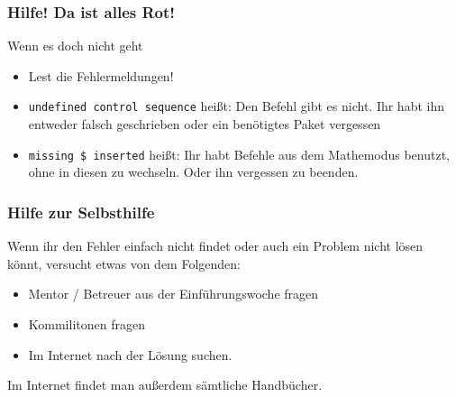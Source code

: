 \begin{frame}
    \frametitle{Hilfe! Da ist alles Rot!}
    \begin{alertblock}{Wenn es doch nicht geht}
	    \begin{itemize}
	        \item Lest die Fehlermeldungen!\pause
	        \item \texttt{undefined control sequence} heißt: Den Befehl gibt es
	            nicht. Ihr habt ihn entweder falsch geschrieben oder ein
	            benötigtes Paket vergessen\pause
	        \item \texttt{missing \$ inserted} heißt: Ihr habt Befehle aus dem
	            Mathemodus benutzt, ohne in diesen zu wechseln. Oder ihn
	            vergessen zu beenden.
	    \end{itemize}
    \end{alertblock}
\end{frame}


\begin{frame}
    \frametitle{Hilfe zur Selbsthilfe}
    Wenn ihr den Fehler einfach nicht findet oder auch ein Problem nicht lösen könnt, versucht etwas von dem Folgenden:
    \begin{itemize}
        \item Mentor / Betreuer aus der Einführungswoche fragen
        \item Kommilitonen fragen
        \item Im Internet nach der Lösung suchen.
    \end{itemize}
    
    \bigskip
    Im Internet findet man außerdem sämtliche Handbücher.
\end{frame}